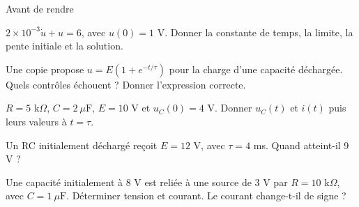 \begin{docu}{Avant de rendre}
\end{docu}


\begin{questions}
\item $2\times10^{-3}\dot u+u=6$, avec $u(0)=1$ V. Donner la constante de temps, la limite, la pente initiale et la solution.
\end{questions}

\begin{questions}
\item Une copie propose $u=E(1+e^{-t/\tau})$ pour la charge d’une capacité déchargée. Quels contrôles échouent ? Donner l’expression correcte.
\end{questions}

\begin{questions}
\item $R=5$ k$\Omega$, $C=2\ \mu\mathrm{ F}$, $E=10$ V et $u_C(0)=4$ V. Donner $u_C(t)$ et $i(t)$ puis leurs valeurs à $t=\tau$.
\end{questions}



\begin{questions}
\item Un RC initialement déchargé reçoit $E=12$ V, avec $\tau=4$ ms. Quand atteint-il 9 V ?
\end{questions}

\begin{questions}
\item Une capacité initialement à 8 V est reliée à une source de 3 V par $R=10$ k$\Omega$, avec $C=1\ \mu\mathrm{ F}$. Déterminer tension et courant. Le courant change-t-il de signe ?
\end{questions}

